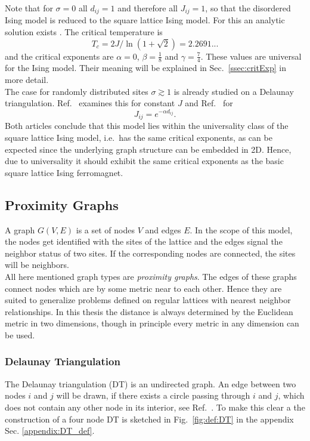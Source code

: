     Note that for \(\sigma = 0\) all \(d_{ij} = 1\) and therefore all
    \(J_{ij} = 1\), so that the disordered Ising model is reduced to the
    square lattice Ising model. For this an analytic solution exists \cite{Onsager1944}.
    The critical temperature is
    \begin{equation}
        T_c = 2J/\ln(1+\sqrt 2) = 2.2691...
        \label{eq:exactTc}
    \end{equation}
    and the critical exponents are \(\alpha = 0\), \(\beta = \frac{1}{8}\)
    and \(\gamma = \frac{7}{4}\). These values are universal for the Ising
    model. Their meaning will be explained in Sec.\ \ref{ssec:critExp} in more detail.\\
    The case for randomly distributed sites \(\sigma \gtrsim 1\) is
    already studied on a Delaunay triangulation. Ref.\ \cite{Janke1994} examines
    this for constant \(J\) and Ref.\ \cite{Lima2000} for
    \begin{equation}
        J_{ij} = e^{-\alpha d_{ij}}.
    \end{equation}
    Both articles conclude that this model lies within the universality
    class of the square lattice Ising model, i.e.\ has the same critical
    exponents, as can be expected since the underlying graph structure can
    be embedded in 2D. Hence, due to universality it should exhibit the same
    critical exponents as the basic square lattice Ising ferromagnet.

\subsection{Proximity Graphs}
\label{ssec:graphtypes}
    A graph \(G(V,E)\) is a set of nodes \(V\) and edges \(E\). In the
    scope of this model, the nodes get identified with the sites of the
    lattice and the edges signal the neighbor status of two sites. If the
    corresponding nodes are connected, the sites will be neighbors.\\
    All here mentioned graph types are \emph{proximity graphs}.
    The edges of these graphs connect nodes which are by some metric near
    to each other.
    Hence they are suited to generalize problems defined on regular
    lattices with nearest neighbor relationships.
    In this thesis the distance is always determined by the Euclidean
    metric in two dimensions, though in principle every metric in any
    dimension can be used.\\

    \subsubsection{Delaunay Triangulation}
        The Delaunay triangulation (DT) is an undirected graph. An edge
        between two nodes \(i\) and \(j\) will be drawn, if there exists
        a circle passing through \(i\) and \(j\), which does not contain
        any other node in its interior, see Ref.\ \cite{Katajainen}.
        To make this clear a the construction of a four node DT is sketched
        in Fig.\ \ref{fig:def:DT} in the appendix Sec. \ref{appendix:DT_def}.

